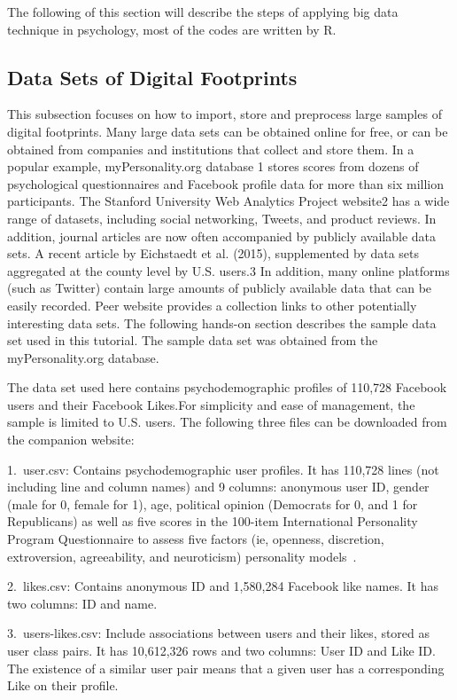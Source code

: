 The following of this section will describe the steps of applying 
big data technique in psychology, most of the codes are written by R.

\subsection{Data Sets of Digital Footprints}

This subsection focuses on how to import, store and preprocess 
large 
samples of digital footprints. Many large data sets can be obtained
 online for free, or can be obtained from companies and 
institutions that collect and store them. In a popular example, 
myPersonality.org database 1 stores scores from dozens of 
psychological questionnaires and Facebook profile data for more 
than six million participants. The Stanford University Web 
Analytics Project website2 has a wide range of datasets, including
 social networking, Tweets, and product reviews. In addition, 
journal articles are now often accompanied by publicly available 
data sets. A recent article by Eichstaedt et al. (2015), 
supplemented by data sets aggregated at the county level by U.S. 
users.3 In addition, many online platforms (such as Twitter) 
contain large amounts of publicly available data that can be easily
 recorded. Peer website provides a collection links to other 
potentially interesting data sets. The following hands-on section 
describes the sample data set used in this tutorial. The sample 
data set was obtained from the myPersonality.org database.

The data set used here contains psychodemographic profiles of 
110,728 Facebook users and their Facebook Likes.For simplicity and
 ease of management, the sample is limited to U.S. users. The 
following three files can be downloaded from the companion website:

1.\ user.csv: Contains psychodemographic user profiles. It has 
110,728 lines (not including line and column names) and 9 columns:
 anonymous user ID, gender (male for 0, female for 1), age, 
political opinion (Democrats for 0, and 1 for Republicans) 
as well as five scores in the 100-item International Personality 
Program Questionnaire to assess five factors (ie, openness, 
discretion, extroversion, agreeability, and neuroticism) 
personality models~\cite{editor18}.

2.\ likes.csv: Contains anonymous ID and 1,580,284 Facebook like 
names. It has two columns: ID and name.

3.\ users-likes.csv: Include associations between users and their 
likes, stored as user class pairs. It has 10,612,326 rows and two 
columns: User ID and Like ID. The existence of a similar user pair
 means that a given user has a corresponding Like on their profile.

